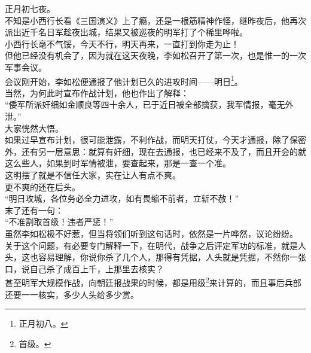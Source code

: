 \begin{multicols}{\theparacolNo}
正月初七夜。\\

不知是小西行长看《三国演义》上了瘾，还是一根筋精神作怪，继昨夜后，他再次派出近千名日军趁夜出城，结果又被巡夜的明军打了个稀里哗啦。\\

小西行长毫不气馁，今天不行，明天再来，一直打到你走为止！\\

但他已经没有机会了，因为就在这天夜晚，李如松召开了第一次，也是惟一的一次军事会议。\\

会议刚开始，李如松便通报了他计划已久的进攻时间——明日\footnote{正月初八。}。\\

当然，为何此时宣布作战计划，他也作出了解释：\\

“倭军所派奸细如金顺良等四十余人，已于近日被全部擒获，我军情报，毫无外泄。”\\

大家恍然大悟。\\

如果过早宣布计划，很可能泄露，不利作战，而明天打仗，今天才通报，除了保密外，还有另一层意思：就算有奸细，现在去通报，也已经来不及了，而且开会的就这么些人，如果到时军情被泄，要查起来，那是一查一个准。\\

这明摆了就是不信任大家，实在让人有点不爽。\\

更不爽的还在后头。\\

“明日攻城，各位务必全力进攻，如有畏缩不前者，立斩不赦！”\\

末了还有一句：\\

“不准割取首级！违者严惩！”\\

虽然李如松极不好惹，但当将领们听到这句话时，依然是一片哗然，议论纷纷。\\

关于这个问题，有必要专门解释一下，在明代，战争之后评定军功的标准，就是人头，这也容易理解，你说你杀了几个人，那得有凭据，人头就是凭据，不然你一张口，说自己杀了成百上千，上那里去核实？\\

甚至明军大规模作战，向朝廷报战果的时候，都是用级\footnote{首级。}来计算的，而且事后兵部还要一一核实，多少人头给多少赏。\\


\end{multicols}
